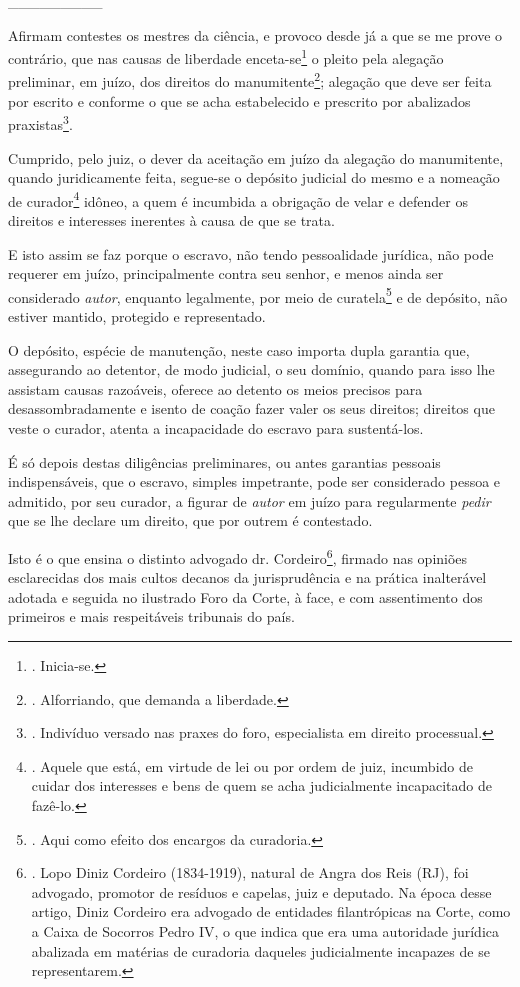 \_\_\_\_\_\_\_\_\_

Afirmam contestes os mestres da ciência, e provoco desde já a que se me
prove o contrário, que nas causas de liberdade enceta-se\footnote{.
  Inicia-se.} o pleito pela alegação preliminar, em juízo, dos direitos
do manumitente\footnote{. Alforriando, que demanda a liberdade.};
alegação que deve ser feita por escrito e conforme o que se acha
estabelecido e prescrito por abalizados praxistas\footnote{. Indivíduo
  versado nas praxes do foro, especialista em direito processual.}.

Cumprido, pelo juiz, o dever da aceitação em juízo da alegação do
manumitente, quando juridicamente feita, segue-se o depósito judicial do
mesmo e a nomeação de curador\footnote{. Aquele que está, em virtude de
  lei ou por ordem de juiz, incumbido de cuidar dos interesses e bens de
  quem se acha judicialmente incapacitado de fazê-lo.} idôneo, a quem é
incumbida a obrigação de velar e defender os direitos e interesses
inerentes à causa de que se trata.

E isto assim se faz porque o escravo, não tendo pessoalidade jurídica,
não pode requerer em juízo, principalmente contra seu senhor, e menos
ainda ser considerado \emph{autor}, enquanto legalmente, por meio de
curatela\footnote{. Aqui como efeito dos encargos da curadoria.} e de
depósito, não estiver mantido, protegido e representado.

O depósito, espécie de manutenção, neste caso importa dupla garantia
que, assegurando ao detentor, de modo judicial, o seu domínio, quando
para isso lhe assistam causas razoáveis, oferece ao detento os meios
precisos para desassombradamente e isento de coação fazer valer os seus
direitos; direitos que veste o curador, atenta a incapacidade do escravo
para sustentá-los.

É só depois destas diligências preliminares, ou antes garantias pessoais
indispensáveis, que o escravo, simples impetrante, pode ser considerado
pessoa e admitido, por seu curador, a figurar de \emph{autor} em juízo
para regularmente \emph{pedir} que se lhe declare um direito, que por
outrem é contestado.

Isto é o que ensina o distinto advogado dr. Cordeiro\footnote{. Lopo
  Diniz Cordeiro (1834-1919), natural de Angra dos Reis (RJ), foi
  advogado, promotor de resíduos e capelas, juiz e deputado. Na época
  desse artigo, Diniz Cordeiro era advogado de entidades filantrópicas
  na Corte, como a Caixa de Socorros Pedro IV, o que indica que era uma
  autoridade jurídica abalizada em matérias de curadoria daqueles
  judicialmente incapazes de se representarem.}, firmado nas opiniões
esclarecidas dos mais cultos decanos da jurisprudência e na prática
inalterável adotada e seguida no ilustrado Foro da Corte, à face, e com
assentimento dos primeiros e mais respeitáveis tribunais do país.

